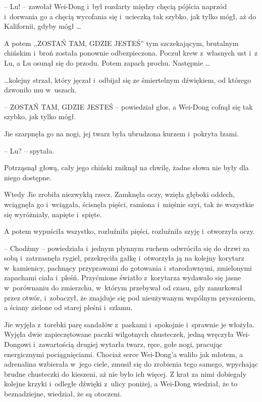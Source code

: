 \documentclass[oneside,polish,11pt,rmheadings]{mwbk}
\begin{document}
-- Lu! -- zawołał Wei-Dong i~był rozdarty między chęcią pójścia naprzód i~dorwania go a chęcią wycofania się i~ucieczką tak szybko, jak tylko mógł, aż do Kalifornii, gdyby mógł \ldots 

A potem ,,ZOSTAŃ TAM, GDZIE JESTEŚ'' tym szczekającym, brutalnym chińskim i~broń została ponownie odbezpieczona. Poczuł krew z~własnych ust i~z Lu, a Lu osunął się do przodu. Potem zapach prochu. Następnie  \ldots 

 \ldots  kolejny strzał, który jęczał i~odbijał się ze śmiertelnym dźwiękiem, od którego dzwoniło mu w~uszach.

-- ZOSTAŃ TAM, GDZIE JESTEŚ -- powiedział głos, a Wei-Dong cofnął się tak szybko, jak tylko mógł.

Jie szarpnęła go na nogi, jej twarz była ubrudzona kurzem i~pokryta łzami.

-- Lu? -- spytała.

Potrząsnął głową, cały jego chiński zniknął na chwilę, żadne słowa nie były dla niego dostępne.

Wtedy Jie zrobiła niezwykłą rzecz. Zamknęła oczy, wzięła głęboki oddech, wciągnęła go i~wciągała, ścisnęła pięści, ramiona i~mięśnie szyi, tak że wszystkie się wyróżniały, napięte i~spięte.

A potem wypuściła wszystko, rozluźniła pięści, rozluźniła szyję i~otworzyła oczy.

-- Chodźmy -- powiedziała i~jednym płynnym ruchem odwróciła się do drzwi za sobą i~zatrzasnęła rygiel, przekręciła gałkę i~otworzyła ją na kolejny korytarz w~kamienicy, pachnący przyprawami do gotowania i~starodawnymi, zmielonymi zapachami ciała i~pleśń. Przyćmione światło z~korytarza wydawało się jasne w~porównaniu do zmierzchu, w~którym przebywał od czasu, gdy zanurkował przez otwór, i~zobaczył, że znajduje się pod nieużywanym wspólnym prysznicem, a ściany zielone od starej pleśni i~szlamu.

Jie wyjęła z~torebki parę sandałów z~paskami i~spokojnie i~sprawnie je włożyła. Wyjęła dwie zapieczętowane paczki wilgotnych chusteczek, jedną wręczyła Wei-Dongowi i~zawartością drugiej wytarła twarz, ręce, gołe nogi, pracując energicznymi pociągnięciami. Chociaż serce Wei-Dong'a waliło jak młotem, a adrenalina wzbierała w~jego ciele, zmusił się do zrobienia tego samego, wpychając brudne chusteczki do kieszeni, aż nie było ich więcej. Z krat za nimi dobiegały kolejne krzyki i~odległe dźwięki z~ulicy poniżej, a Wei-Dong wiedział, że to beznadziejne, wiedział, że są otoczeni.
\end{document}
